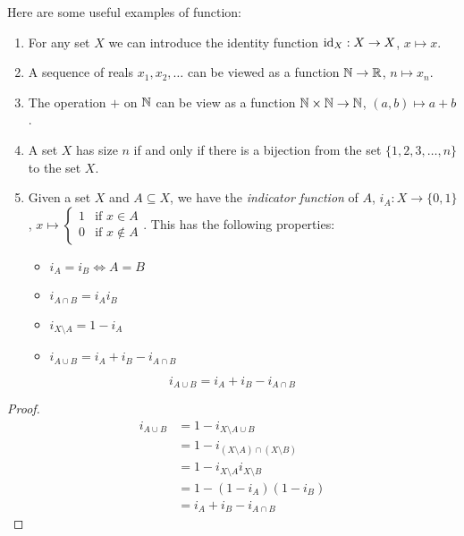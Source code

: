 \documentclass[../main.tex]{subfiles}
\begin{document}
\begin{example}
  Here are some useful examples of function:
  \begin{enumerate}
    \item For any set $X$ we can introduce the identity function $\mathrm{id}_X: X \to X$, $x \mapsto x$.
    \item A sequence of reals $x_1, x_2, \ldots$ can be viewed as a function $\mathbb{N} \to \mathbb{R}$, $n \mapsto x_n$.
    \item The operation $+$ on $\mathbb{N}$ can be view as a function $\mathbb{N} \times \mathbb{N} \to \mathbb{N}$, $(a, b) \mapsto a + b$.
    \item A set $X$ has size $n$ if and only if there is a bijection from the set $\{1, 2, 3, \ldots, n\}$ to the set $X$.
    \item Given a set $X$ and $A \subseteq X$, we have the \textit{indicator function} of $A$, $i_A: X \to \{0, 1\}$, $x \mapsto \begin{cases}
    1 & \text{if } x\in A \\
    0 & \text{if } x\notin A
    \end{cases}$. This has the following properties:
    \begin{itemize}
      \item $i_A = i_B \iff A = B$
      \item $i_{A \cap B} = i_A i_B$
      \item $i_{X \setminus A} = 1 - i_A$
      \item $i_{A \cup B} = i_A + i_B - i_{A \cap B}$
    \end{itemize}
  \end{enumerate}
\end{example}
\begin{proposition}
  \[
    i_{A \cup B} = i_A + i_B - i_{A \cap B}
  \]
\end{proposition}
\begin{proof}
  \begin{align*}
    i_{A \cup B} &= 1 - i_{X \setminus A \cup B} \\
                 &= 1 - i_{(X \setminus A) \cap (X \setminus B)} \\
                 &= 1 - i_{X \setminus A} i_{X \setminus B} \\
                 &= 1 - (1 - i_A)(1 - i_B) \\
                 &= i_A + i_B - i_{A \cap B}
  \end{align*}
\end{proof}
\end{document}
